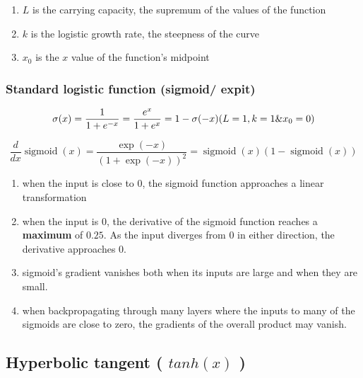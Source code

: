 \vspace{0.2cm}

\begin{enumerate}
    \item $L$ is the carrying capacity, the supremum of the values of the function
    \item $k$ is the logistic growth rate, the steepness of the curve
    \item $x_{0}$ is the $x$ value of the function's midpoint
\end{enumerate}


\subsubsection{Standard logistic function (sigmoid/ expit) \cite{wiki-Logistic_function,wiki-Sigmoid_function,dnn-1}}  \label{sigmoid}\label{expit}\label{Standard logistic function}
\[
    \sigma(x) 
    = {\dfrac{1}{1+e^{-x}}} 
    = {\dfrac{e^{x}}{1+e^{x}}} 
    = 1- \sigma(-x)
    \hfill
    (L=1 , k=1 \& x_{0}=0)
\]

\[
    \dfrac{d}{dx} \operatorname{sigmoid}(x) = \dfrac{\exp(-x)}{(1 + \exp(-x))^2} = \operatorname{sigmoid}(x)\left(1-\operatorname{sigmoid}(x)\right)
\]

\begin{enumerate}
    \item when the input is close to $0$, the sigmoid function approaches a linear transformation

    \item when the input is $0$, the derivative of the sigmoid function reaches a \textbf{maximum} of $0.25$. As the input diverges from $0$ in either direction, the derivative approaches $0$.

    \item sigmoid’s gradient vanishes both when its inputs are large and when they are small. 
    
    \item when backpropagating through many layers where the inputs to many of the sigmoids are close to zero, the gradients of the overall product may vanish.

\end{enumerate}


\subsection{Hyperbolic tangent ( $tanh(x)$ ) \cite{wiki-Sigmoid_function,wiki-Hyperbolic_functions, dnn-1}}\label{Hyperbolic tangent}

